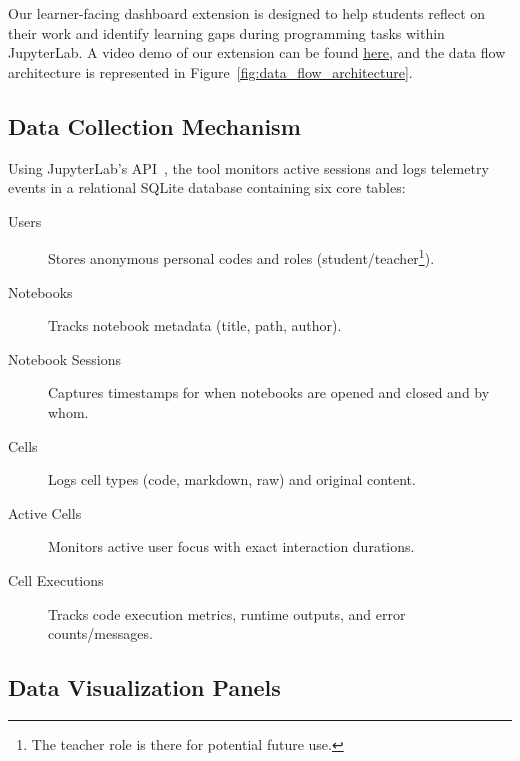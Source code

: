 \documentclass[sigconf]{acmart}
\begin{document}
Our learner-facing dashboard extension is designed to help students reflect on their work and identify learning gaps during programming tasks within JupyterLab. A video demo of our extension can be found \href{https://www.youtube.com/watch?v=VZKJdUi2B-k}{\color{blue}\underline{here}}, and the data flow architecture is represented in Figure~\ref{fig:data_flow_architecture}.
\subsection{Data Collection Mechanism}

Using JupyterLab's API~\cite{jupyterlab_tutorial_2024, jupyterlab_extension_template}, the tool monitors active sessions and logs telemetry events in a relational SQLite database containing six core tables:
\begin{description}
    \item[Users] Stores anonymous personal codes and roles (student/teacher\footnote{The teacher role is there for potential future use.}). %
    
    \item[Notebooks] Tracks notebook metadata (title, path, author).
    
    \item[Notebook Sessions] Captures timestamps for when notebooks are opened and closed and by whom.
    
    \item[Cells] Logs cell types (code, markdown, raw) and original content.
    
    \item[Active Cells] Monitors active user focus with exact interaction durations.
    
    \item[Cell Executions] Tracks code execution metrics, runtime outputs, and error counts/messages.
\end{description}

\subsection{Data Visualization Panels}
\end{document}
